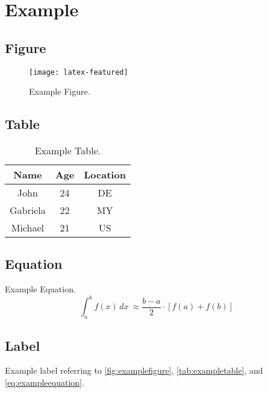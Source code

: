\chapter{Example}

\section{Figure}

\begin{figure}
  \centering
  \texttt{[image: latex-featured]}
  \caption{Example Figure.}
  \label{fig:examplefigure}
\end{figure}

\section{Table}

\begin{table}
  \centering
  \caption{Example Table.}
  \label{tab:exampletable}
  \begin{tabular}{ccc}
    \toprule
    Name & Age & Location \\ \midrule
    John & 24 & DE \\
    Gabriela & 22 & MY \\
    Michael & 21 & US \\ \bottomrule
  \end{tabular}
\end{table}

\section{Equation}

Example Equation.
\begin{equation}
  \int_{a}^{b} f(x) \, dx\ \approx \frac{b - a}{2} \cdot [f(a) + f(b)]
  \label{eq:exampleequation}
\end{equation}

\section{Label}

Example label referring to \autoref{fig:examplefigure}, \autoref{tab:exampletable}, and \autoref{eq:exampleequation}.

